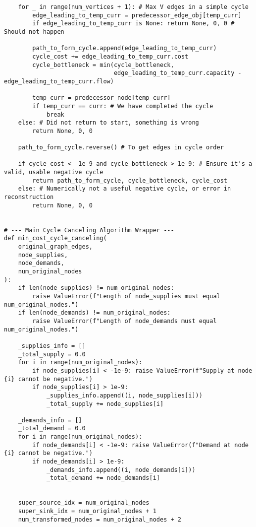 \begin{verbatim}
    for _ in range(num_vertices + 1): # Max V edges in a simple cycle
        edge_leading_to_temp_curr = predecessor_edge_obj[temp_curr]
        if edge_leading_to_temp_curr is None: return None, 0, 0 # Should not happen

        path_to_form_cycle.append(edge_leading_to_temp_curr)
        cycle_cost += edge_leading_to_temp_curr.cost
        cycle_bottleneck = min(cycle_bottleneck, 
                               edge_leading_to_temp_curr.capacity - edge_leading_to_temp_curr.flow)
        
        temp_curr = predecessor_node[temp_curr]
        if temp_curr == curr: # We have completed the cycle
            break
    else: # Did not return to start, something is wrong
        return None, 0, 0
        
    path_to_form_cycle.reverse() # To get edges in cycle order

    if cycle_cost < -1e-9 and cycle_bottleneck > 1e-9: # Ensure it's a valid, usable negative cycle
        return path_to_form_cycle, cycle_bottleneck, cycle_cost
    else: # Numerically not a useful negative cycle, or error in reconstruction
        return None, 0, 0


# --- Main Cycle Canceling Algorithm Wrapper ---
def min_cost_cycle_canceling(
    original_graph_edges,
    node_supplies,
    node_demands,
    num_original_nodes
):
    if len(node_supplies) != num_original_nodes:
        raise ValueError(f"Length of node_supplies must equal num_original_nodes.")
    if len(node_demands) != num_original_nodes:
        raise ValueError(f"Length of node_demands must equal num_original_nodes.")

    _supplies_info = []
    _total_supply = 0.0
    for i in range(num_original_nodes):
        if node_supplies[i] < -1e-9: raise ValueError(f"Supply at node {i} cannot be negative.")
        if node_supplies[i] > 1e-9:
            _supplies_info.append((i, node_supplies[i]))
            _total_supply += node_supplies[i]

    _demands_info = []
    _total_demand = 0.0
    for i in range(num_original_nodes):
        if node_demands[i] < -1e-9: raise ValueError(f"Demand at node {i} cannot be negative.")
        if node_demands[i] > 1e-9:
            _demands_info.append((i, node_demands[i]))
            _total_demand += node_demands[i]
    

    super_source_idx = num_original_nodes
    super_sink_idx = num_original_nodes + 1
    num_transformed_nodes = num_original_nodes + 2


\end{verbatim}

